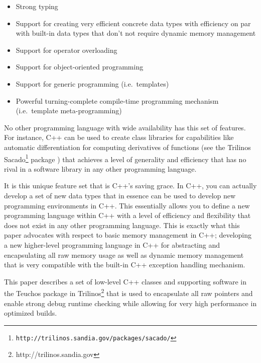 \documentclass[pdf,ps2pdf,11pt]{SANDreport}
\begin{document}
\begin{itemize}

{}\item Strong typing

{}\item Support for creating very efficient concrete data types with
efficiency on par with built-in data types that don't not require
dynamic memory management

{}\item Support for operator overloading

{}\item Support for object-oriented programming

{}\item Support for generic programming (i.e.\ templates)

{}\item Powerful turning-complete compile-time programming mechanism
(i.e.\ template meta-programming)

\end{itemize}

No other programming language with wide availability has this set of
features.  For instance, C++ can be used to create class libraries for
capabilities like automatic differentiation {}\cite{ref:ad} for
computing derivatives of functions (see the Trilinos
Sacado\footnote{\texttt{http://trilinos.sandia.gov/packages/sacado/}}
package {}\cite{phippsEtAl2006}) that achieves a level of generality
and efficiency that has no rival in a software library in any other
programming language.

It is this unique feature set that is C++'s saving grace.  In C++, you
can actually develop a set of new data types that in essence can be
used to develop new programming environments in C++.  This essentially
allows you to define a new programming language within C++ with a
level of efficiency and flexibility that does not exist in any other
programming language.  This is exactly what this paper advocates
with respect to basic memory management in C++; developing a new
higher-level programming language in C++ for abstracting and
encapsulating all raw memory usage as well as dynamic memory
management that is very compatible with the built-in C++ exception
handling mechanism.

This paper describes a set of low-level C++ classes and supporting
software in the Teuchos package in
Trilinos\footnote{http://trilinos.sandia.gov} that is used to
encapsulate all raw pointers and enable strong debug runtime checking
while allowing for very high performance in optimized builds.
\end{document}
